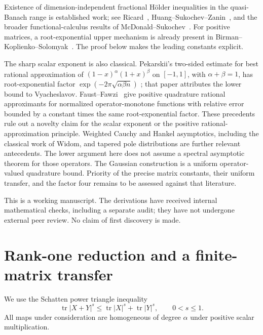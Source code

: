 \documentclass[11pt]{article}
\numberwithin{equation}{section}
\newcommand{\tr}{\operatorname{tr}}
\begin{document}
Existence of dimension-independent fractional H\"older inequalities in
the quasi-Banach range is established work; see
Ricard~\cite{Ricard}, Huang--Sukochev--Zanin~\cite{HSZ}, and the broader
functional-calculus results of McDonald--Sukochev~\cite{MS}.
For positive matrices, a root-exponential upper mechanism is already
present in Birman--Koplienko--Solomyak~\cite[Section~3, Lemma~3 and
(3.10)]{BKS}. The proof below makes the leading constants explicit.

The sharp scalar exponent is also classical. Pekarskii's two-sided
estimate for best rational approximation of
$(1-x)^\alpha(1+x)^\beta$ on $[-1,1]$, with $\alpha+\beta=1$, has
root-exponential factor $\exp(-2\pi\sqrt{\alpha\beta n})$
\cite[Corollary~3, (5.2)]{Pekarskii}; that paper attributes the lower
bound to Vyacheslavov. Faust--Fawzi~\cite[Theorem~3]{FF} give positive
quadrature rational approximants for normalized operator-monotone
functions with relative error bounded by a constant times the same
root-exponential factor. These precedents rule out a novelty claim for
the scalar exponent or the positive rational-approximation principle.
Weighted Cauchy and Hankel asymptotics, including the classical work of
Widom, and tapered pole distributions are further relevant antecedents.
The lower argument here does not assume a spectral asymptotic theorem
for those operators. The Gaussian construction is a uniform
operator-valued quadrature bound. Priority of the precise matrix
constants, their uniform transfer, and the factor four remains to be
assessed against that literature.

This is a working manuscript. The derivations have received internal
mathematical checks, including a separate audit; they have not undergone
external peer review. No claim of first discovery is made.

\section{Rank-one reduction and a finite-matrix transfer}

We use the Schatten power triangle inequality
\begin{equation}\label{eq:power-triangle}
 \tr|X+Y|^s\le\tr|X|^s+\tr|Y|^s,\qquad 0<s\le1.
\end{equation}
All maps under consideration are homogeneous of degree $\alpha$ under
positive scalar multiplication.
\end{document}
